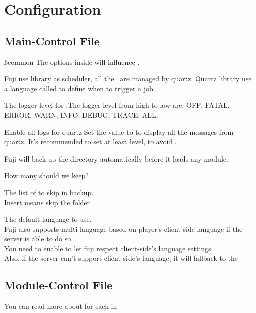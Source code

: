 \chapter{Configuration}\label{ch:configuration}
\section{Main-Control File}

\ss{common}
The  options inside  will influence .

Fuji use  library as scheduler, all the~ are managed by quartz.
Quartz library use a language called  to define when to trigger a job.

The logger level for .The logger level from high to low are: OFF, FATAL, ERROR, WARN, INFO, DEBUG, TRACE, ALL.

\begin{example}{Enable all logs for quartz}
    Set the value to  to display all the messages from quartz.
    It's recommended to set at least  level, to avoid .
\end{example}

Fuji will back up the  directory automatically before it loads any module.

How many  should we keep?

The list of  to skip in backup.
\\
Insert  means skip the folder .

The default language to use.
\\
Fuji also supports multi-language based on player's client-side language if the server is able to do so.
\\
You need to enable  to let fuji respect client-side's language settings.
\\
Also, if the server can't support client-side's language, it will fallback to the 



\clearpage
\section{Module-Control File}
You can read more about  for each  in 